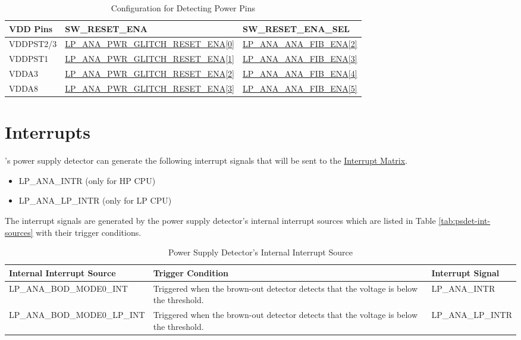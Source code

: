 \documentclass[main\_\_EN.tex]{subfiles}
\begin{document}
\begin{longtable}{ | l | l | l | }
\caption{Configuration for Detecting Power Pins} \label{tab:psdet-power-detec-pins}
\\ \hline
\rowcolor{lightgray}
\textbf{VDD Pins} & \textbf{SW\_RESET\_ENA}  &  \textbf{SW\_RESET\_ENA\_SEL}\\ \hline
VDDPST2/3 & \hyperref[fielddesc:LPANAPWRGLITCHRESETENA]{LP\_ANA\_PWR\_GLITCH\_RESET\_ENA[0]} & \hyperref[fielddesc:LPANAANAFIBENA]{LP\_ANA\_ANA\_FIB\_ENA[2]} \\\hline
VDDPST1 & \hyperref[fielddesc:LPANAPWRGLITCHRESETENA]{LP\_ANA\_PWR\_GLITCH\_RESET\_ENA[1]} & \hyperref[fielddesc:LPANAANAFIBENA]{LP\_ANA\_ANA\_FIB\_ENA[3]} \\\hline
VDDA3 & \hyperref[fielddesc:LPANAPWRGLITCHRESETENA]{LP\_ANA\_PWR\_GLITCH\_RESET\_ENA[2]} & \hyperref[fielddesc:LPANAANAFIBENA]{LP\_ANA\_ANA\_FIB\_ENA[4]} \\\hline
VDDA8 & \hyperref[fielddesc:LPANAPWRGLITCHRESETENA]{LP\_ANA\_PWR\_GLITCH\_RESET\_ENA[3]} & \hyperref[fielddesc:LPANAANAFIBENA]{LP\_ANA\_ANA\_FIB\_ENA[5]} \\\hline
\end{longtable}


\section{Interrupts}

\chipname{}'s power supply detector can generate the following interrupt signals that will be sent to the \hyperref[mod:intmtrx]{Interrupt Matrix}.

    \begin{itemize}
        \item LP\_ANA\_INTR (only for HP CPU)
        \item LP\_ANA\_LP\_INTR (only for LP CPU)
    \end{itemize}

The interrupt signals are generated by the power supply detector's internal interrupt sources which are listed in Table \ref{tab:psdet-int-sources} with their trigger conditions.

\begin{longtable}{ |l | L{7.3cm} | l | }
\caption{Power Supply Detector's Internal Interrupt Source} \label{tab:psdet-int-sources}
\\ \hline
{}
\textbf{Internal Interrupt Source} & \textbf{Trigger Condition}  &  \textbf{Interrupt Signal}\\ \hline
\label{int:LPANABODMODE0INT}LP\_ANA\_BOD\_MODE0\_INT  & Triggered when the brown-out detector detects that the voltage is below
the threshold.  & LP\_ANA\_INTR  \\ \hline
\label{int:LPANABODMODE0LPINT}LP\_ANA\_BOD\_MODE0\_LP\_INT & Triggered when the brown-out detector detects that the voltage is below
the threshold.  & LP\_ANA\_LP\_INTR \\ \hline
\end{longtable}
\end{document}
